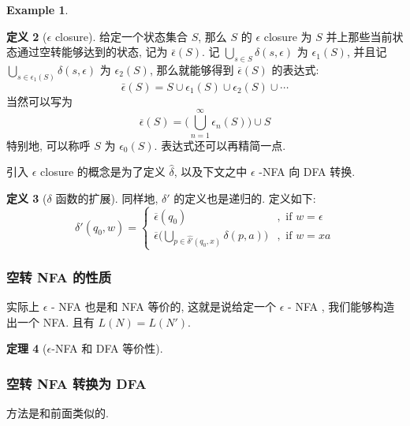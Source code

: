 \documentclass[12pt]{ctexart}
\theoremstyle{definition}
\theoremstyle{definition}
\newtheorem{definition}{定义}[section]
\newtheorem{thm}[definition]{定理}
\theoremstyle{plain}
\newtheorem{exam}[definition]{Example}
\begin{document}
\begin{exam}
\end{exam}

\begin{definition}[\(\epsilon\) closure]
给定一个状态集合 \(S\), 那么 \(S\) 的 \(\epsilon\) closure 为 \(S\) 并上那些当前状态通过空转能够达到的状态, 记为 \(\bar{\epsilon} (S)\). 记 \(\bigcup_{s \in S} \delta (s , \epsilon ) \) 为 \(\epsilon _{1} (S)\), 并且记 \(\bigcup_{s \in \epsilon _{1} (S)} \delta (s, \epsilon )\) 为 \(\epsilon _{2} (S) \), 那么就能够得到 \(\overline{\epsilon} (S)\) 的表达式: 
\begin{equation}
\bar\epsilon (S) = S \cup \epsilon_{1} (S) \cup \epsilon_{2	} (S) \cup \cdots
\end{equation}
当然可以写为 
\begin{equation}
\overline{\epsilon} (S)  = \big(\bigcup_{n = 1} ^{ \infty}\epsilon_{n} (S) \big) \cup S
\end{equation}
特别地, 可以称呼 \(S\) 为 \(\epsilon_{0} (S)\). 表达式还可以再精简一点. 
\end{definition}

引入 \(\epsilon\) closure 的概念是为了定义 \(\hat{\delta}\), 以及下文之中 \(\epsilon\) -NFA 向 DFA 转换. 
\begin{definition}[\(\delta\) 函数的扩展]
同样地, \(\delta'\) 的定义也是递归的. 定义如下: 
\begin{equation}
\delta' (q_{0}, w) = 
\begin{cases}
\overline{\epsilon} (q_{0}) &, \text{ if } w = \epsilon \\
\overline{\epsilon} \big(\bigcup_{p\in \hat{\delta'}(q _{0}, x)} \delta (p,a)\big) &, \text{ if } w = xa
\end{cases}
\end{equation}
\end{definition}

\subsubsection{空转 NFA 的性质}
实际上 \(\epsilon\) - NFA 也是和 NFA 等价的, 这就是说给定一个 \(\epsilon\) - NFA , 我们能够构造出一个 NFA. 且有 \(L (N )  = L (N ' ) \). 
\begin{thm}[\(\epsilon\)-NFA 和 DFA 等价性] 
\end{thm}
\subsubsection{空转 NFA 转换为 DFA}
方法是和前面类似的. %
\end{document}
